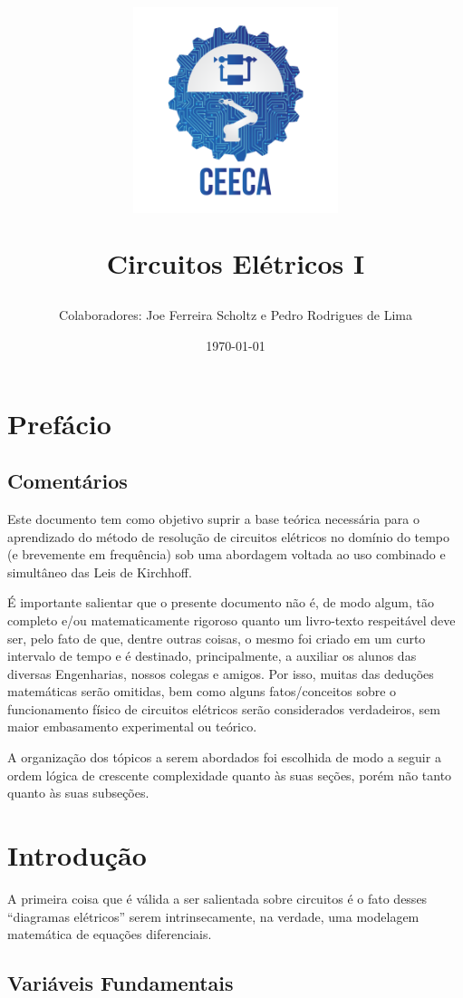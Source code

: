 \documentclass{article}
\title{\begin{center}
    \includegraphics[width=0.45\textwidth]{img/ceeca.png}
\end{center}
\vspace{2mm}
\textbf{Circuitos Elétricos I}}
\author{Colaboradores: Joe Ferreira Scholtz e Pedro Rodrigues de Lima}
\date{\today}
\numberwithin{equation}{section}
\begin{document}
\maketitle

\newpage
\tableofcontents
\newpage

\section{Prefácio}
\label{sec:pref}

\subsection{Comentários}
\label{subsec:coment}

Este documento tem como objetivo suprir a base teórica necessária para o aprendizado do método de resolução de circuitos elétricos no domínio do tempo (e brevemente em frequência) sob uma abordagem voltada ao uso combinado e simultâneo das Leis de Kirchhoff.

É importante salientar que o presente documento não é, de modo algum, tão completo e/ou matematicamente rigoroso quanto um livro-texto respeitável deve ser, pelo fato de que, dentre outras coisas, o mesmo foi criado em um curto intervalo de tempo e é destinado, principalmente, a auxiliar os alunos das diversas Engenharias, nossos colegas e amigos. Por isso, muitas das deduções matemáticas serão omitidas, bem como alguns fatos/conceitos sobre o funcionamento físico de circuitos elétricos serão considerados verdadeiros, sem maior embasamento experimental ou teórico.

A organização dos tópicos a serem abordados foi escolhida de modo a seguir a ordem lógica de crescente complexidade quanto às suas seções, porém não tanto quanto às suas subseções.

\newpage

\section{Introdução}
\label{sec:introd}

A primeira coisa que é válida a ser salientada sobre circuitos é o fato desses ``diagramas elétricos''  serem intrinsecamente, na verdade, uma modelagem matemática de equações diferenciais.

\subsection{Variáveis Fundamentais}
\label{subsec:variaveis}
\end{document}
